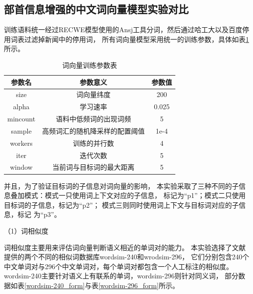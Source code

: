 \subsection{部首信息增强的中文词向量模型实验对比}
训练语料统一经过RECWE模型使用的Ansj工具分词，然后通过哈工大以及百度停用词表过滤掉新闻中的停用词，
所有词向量模型采用统一的训练参数，具体如表\ref{word_vec_arg_form}所示。
\begin{table}[h]
    \caption{词向量训练参数表}
    \begin{tabular}{|c|c|c|}
        \hline
        参数名 & 参数意义 & 参数值 \\
        \hline
        size & 词向量纬度 & 200 \\
        \hline
        alpha & 学习速率 & 0.025 \\
        \hline
        mincount & 语料中低频词的出现词频 & 5 \\
        \hline
        sample & 高频词汇的随机降采样的配置阈值 & 1e-4 \\
        \hline
        workers & 训练的并行数 & 4 \\
        \hline
        iter & 迭代次数 & 5 \\
        \hline
        window & 当前词与目标词的最大距离 & 5 \\
        \hline
    \end{tabular}
    \label{word_vec_arg_form}
    \end{table}

并且，为了验证目标词的子信息对词向量的影响，
本实验采取了三种不同的子信息叠加模式：模式一只使用词上下文对应的子信息，
标记为“p1”；模式二只使用目标词的子信息，标记为“p2”；
模式三则同时使用词上下文与目标词对应的子信息，标记
为“p3”。

（1）词相似度

词相似度主要用来评估词向量判断语义相近的单词对的能力。
本实验选择了文献\cite{chen2015joint}提供的两个不同的相似词数据库wordsim-240和wrodsim-296，
它们分别包含240个中文单词对与296个中文单词对，每个单词对都包含一个人工标注的相似度。
wordsim-240主要针对语义上有联系的单词，wordsim-296则针对同义词，
部分数据如表\ref{wordsim-240_form}与表\ref{wordsim-296_form}所示。


